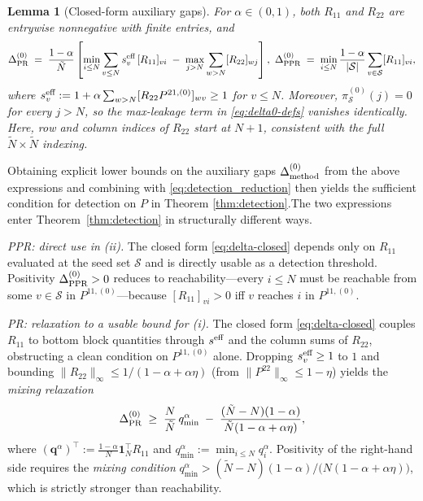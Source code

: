 \documentclass{article}
\theoremstyle{plain}
\newtheorem{lemma}[theorem]{Lemma}
\theoremstyle{definition}
\def\tp{\intercal}
\newcommand{\arXivtag}[1][]{#1}
\begin{document}
\begin{lemma}[Closed-form auxiliary gaps]\label{lem:gaps-closed-form}
	For $\alpha \in (0,1)$, both $R_{11}$ and $R_{22}$ are entrywise nonnegative with finite entries, and
	\begin{equation}\label{eq:delta-closed}
		\Delta^{(0)}_{\textnormal{PR}} \;=\; \frac{1-\alpha}{\tilde{N}}\left[\min_{i \leq N}\sum_{v \leq N} s_v^{\textnormal{eff}}\,[R_{11}]_{vi} \;-\; \max_{j > N}\sum_{w > N}[R_{22}]_{wj}\right],\,\, \Delta^{(0)}_{\textnormal{PPR}} \;=\; \min_{i \leq N}\frac{1-\alpha}{|\mathcal{S}|}\sum_{v \in \mathcal{S}}[R_{11}]_{vi},
	\end{equation}
	where $s_v^{\textnormal{eff}} := 1 + \alpha\sum_{w > N}[R_{22}P^{21,(0)}]_{wv} \geq 1$ for $v \leq N$. Moreover, $\pi_{\mathcal{S}}^{(0)}(j) = 0$ for every $j > N$, so the max-leakage term in \eqref{eq:delta0-defs} vanishes identically. \arXivtag[Here, row and column indices of $R_{22}$ start at $N+1$, consistent with the full $\tilde{N}\times\tilde{N}$ indexing.]
\end{lemma}
Obtaining explicit lower bounds on the auxiliary gaps $\Delta^{(0)}_{\textup{method}}$ from the above expressions and combining with \eqref{eq:detection_reduction} then yields the sufficient condition  for detection on $P$ in Theorem \ref{thm:detection}.\arXivtag The two expressions enter Theorem~\ref{thm:detection} in structurally different ways.

\emph{PPR: direct use in (ii).} The closed form \eqref{eq:delta-closed} depends only on $R_{11}$ evaluated at the seed set $\mathcal{S}$ and is directly usable as a detection threshold. Positivity $\Delta^{(0)}_{\textnormal{PPR}} > 0$ reduces to reachability---every $i \leq N$ must be reachable from some $v \in \mathcal{S}$ in $P^{11,(0)}$---because $[R_{11}]_{vi} > 0$ iff $v$ reaches $i$ in $P^{11,(0)}$.

\emph{PR: relaxation to a usable bound for (i).} The closed form \eqref{eq:delta-closed} couples $R_{11}$ to \arXivtag[bottom block] quantities through $s^{\textnormal{eff}}$ and the column sums of $R_{22}$, obstructing a clean condition on $P^{11,(0)}$ alone. Dropping $s_v^{\textnormal{eff}} \geq 1$ to $1$ and bounding $\|R_{22}\|_\infty \leq 1/(1-\alpha+\alpha\eta)$ (from $\|P^{22}\|_\infty \leq 1-\eta$) yields the \emph{mixing relaxation}
\begin{equation}\label{eq:delta-PR-bound}
	\Delta^{(0)}_{\textnormal{PR}} \;\geq\; \frac{N}{\tilde{N}}\,q_{\min}^\alpha \;-\; \frac{(\tilde{N}-N)(1-\alpha)}{\tilde{N}(1-\alpha+\alpha\eta)},
\end{equation}
where $(\mathbf{q}^{\alpha})^\tp := \tfrac{1-\alpha}{N}\mathbf{1}_N^\tp R_{11}$ and $q_{\min}^\alpha := \min_{i \leq N}q_i^\alpha$. Positivity of the right-hand side requires the \emph{mixing condition} $q_{\min}^\alpha > (\tilde{N}-N)(1-\alpha)/\bigl(N(1-\alpha+\alpha\eta)\bigr)$, which is strictly stronger than reachability.
\end{document}
